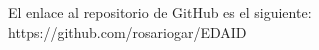 \documentclass[../main.tex]{subfiles}
\begin{document}
El enlace al repositorio de GitHub es el siguiente: https://github.com/rosariogar/EDAID
\end{document}
